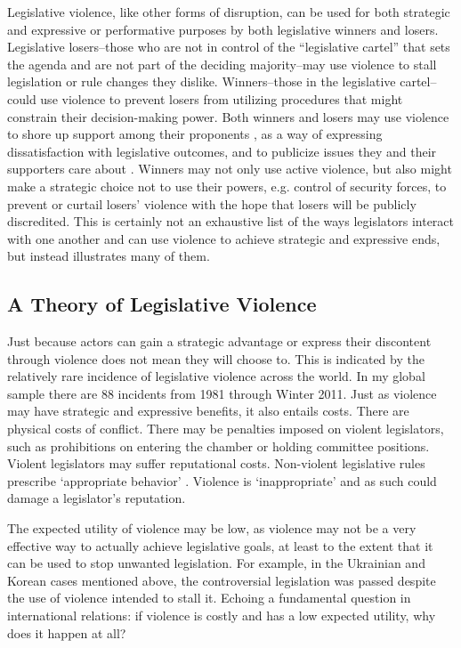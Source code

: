 \documentclass[a4paper]{article}\usepackage[]{graphicx}\usepackage[]{color}
\begin{document}
Legislative violence, like other forms of disruption, can be used for both strategic \citep[see][]{Beaulieu2008,BeaulieuForthcoming} and expressive or performative \citep[see][]{Rai2013,Spary2013} purposes by both legislative winners and losers. Legislative losers--those who are not in control of the ``legislative cartel''  that sets the agenda \citep{cox2007} and are not part of the deciding majority--may use violence to stall legislation or rule changes they dislike. Winners--those in the legislative cartel--could use violence to prevent losers from utilizing procedures that might constrain their decision-making power. Both winners and losers may use violence to shore up support among their proponents \citep{wilkinson2006}, as a way of expressing dissatisfaction with legislative outcomes, and to publicize issues they and their supporters care about \citep{Spary2013}. Winners may not only use active violence, but also might make a strategic choice not to use their powers, e.g. control of security forces, to prevent or curtail losers' violence \citep[see the work on ethnic violence in India by][]{wilkinson2006} with the hope that losers will be publicly discredited. This is certainly not an exhaustive list of the ways legislators interact with one another and can use violence to achieve strategic and expressive ends, but instead illustrates many of them.

\subsection{A Theory of Legislative Violence}

Just because actors can gain a strategic advantage or express their discontent through violence does not mean they will choose to. This is indicated by the relatively rare incidence of legislative violence across the world. In my global sample there are 88 incidents from 1981 through Winter 2011. Just as violence may have strategic and expressive benefits, it also entails costs. There are physical costs of conflict. There may be penalties imposed on violent legislators, such as prohibitions on entering the chamber or holding committee positions. Violent legislators may suffer reputational costs. Non-violent legislative rules prescribe `appropriate behavior' \citep{March2008}. Violence is `inappropriate' and as such could damage a legislator's reputation. 

The expected utility of violence may be low, as violence may not be a very effective way to actually achieve legislative goals, at least to the extent that it can be used to stop unwanted legislation. For example, in the Ukrainian and Korean cases mentioned above, the controversial legislation was passed despite the use of violence intended to stall it. Echoing a fundamental question in international relations: if violence is costly and has a low expected utility, why does it happen at all? 
\end{document}
